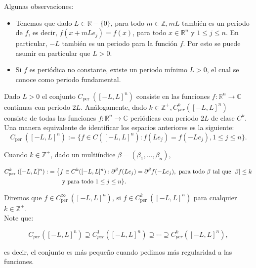\documentclass[12pt]{article}
\newcommand\R{\ensuremath{\mathbb{R}}}
\begin{document}
Algunas observaciones:
\begin{itemize}
    \item  Tenemos que dado $L\in \R-\{0\}$, para todo $m \in \mathbb{Z}, m L$ también es un periodo de $f$, es  decir, $f(x+m L e_j)=f(x)$, para todo $x \in \mathbb{R}^n $ y $1\leq j\leq n$. En particular, $-L$ también es un periodo para la función $f$. Por esto se puede asumir en particular que $L>0$.
    
    \item Si $f$ es periódica no constante, existe un periodo mínimo $L>0$, el cual se conoce como periodo fundamental.
\end{itemize}

\begin{note}
    Dado $L>0$ el conjunto $C_{\text {per }}([-L, L]^n)$ consiste en las funciones $f: \mathbb{R}^n \rightarrow \mathbb{C}$ continuas con periodo $2L$. Análogamente, dado $k \in \mathbb{Z}^{+}, C_{p e r}^k([-L, L]^n)$ consiste de todas las funciones $f: \mathbb{R}^n \rightarrow \mathbb{C}$ periódicas con periodo $2 L$ de clase $C^k$.\\

Una manera equivalente de identificar los espacios anteriores es la siguiente:
$$
C_{\text {per }}([-L, L]^n):=\{f \in C([-L, L]^n): f(Le_j)=f(-Le_j), 1\leq j\leq n\}.
$$


Cuando $k \in \mathbb{Z}^{+}$, dado un multiíndice $\beta=(\beta_1,\ldots,\beta_n)$,

\begin{align*}
    C_{\text {per }}^k([-L, L]^n):&=\left\{f \in C^k([-L, L]^n): \partial^{\beta}f(Le_j)=\partial^{\beta}f(-Le_j), \text{ para todo } \beta \text{ tal que } |\beta|\leq k\right. \\
    &\hspace{0.8cm} \text{y para todo } 1\leq j\leq n\}.
\end{align*}

Diremos que $f \in C_{\text {per }}^{\infty}([-L, L]^n)$, si $f \in C_{\text {per }}^k([-L, L]^n)$ para cualquier $k \in \mathbb{Z}^{+}$.\\

Note que:

$$
C_{p e r}([-L, L]^n) \supseteq C_{p e r}^1([-L, L]^n) \supseteq \cdots \supseteq C_{p e r}^k([-L, L]^n),
$$

es decir, el conjunto es más pequeño cuando pedimos más regularidad a las funciones.

\end{note}
\end{document}
